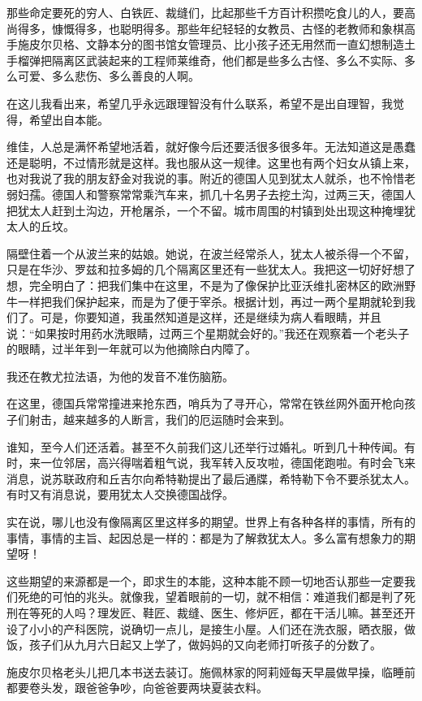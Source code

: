 那些命定要死的穷人、白铁匠、裁缝们，比起那些千方百计积攒吃食儿的人，要高尚得多，慷慨得多，也聪明得多。那些年纪轻轻的女教员、古怪的老教师和象棋高手施皮尔贝格、文静本分的图书馆女管理员、比小孩子还无用然而一直幻想制造土手榴弹把隔离区武装起来的工程师莱维奇，他们都是些多么古怪、多么不实际、多么可爱、多么悲伤、多么善良的人啊。

在这儿我看出来，希望几乎永远跟理智没有什么联系，希望不是出自理智，我觉得，希望出自本能。

维佳，人总是满怀希望地活着，就好像今后还要活很多很多年。无法知道这是愚蠢还是聪明，不过情形就是这样。我也服从这一规律。这里也有两个妇女从镇上来，也对我说了我的朋友舒金对我说的事。附近的德国人见到犹太人就杀，也不怜惜老弱妇孺。德国人和警察常常乘汽车来，抓几十名男子去挖土沟，过两三天，德国人把犹太人赶到土沟边，开枪屠杀，一个不留。城市周围的村镇到处出现这种掩埋犹太人的丘坟。

隔壁住着一个从波兰来的姑娘。她说，在波兰经常杀人，犹太人被杀得一个不留，只是在华沙、罗兹和拉多姆的几个隔离区里还有一些犹太人。我把这一切好好想了想，完全明白了：把我们集中在这里，不是为了像保护比亚沃维扎密林区的欧洲野牛一样把我们保护起来，而是为了便于宰杀。根据计划，再过一两个星期就轮到我们了。可是，你要知道，我虽然知道是这样，还是继续为病人看眼睛，并且说：“如果按时用药水洗眼睛，过两三个星期就会好的。”我还在观察着一个老头子的眼睛，过半年到一年就可以为他摘除白内障了。

我还在教尤拉法语，为他的发音不准伤脑筋。

在这里，德国兵常常撞进来抢东西，哨兵为了寻开心，常常在铁丝网外面开枪向孩子们射击，越来越多的人断言，我们的厄运随时会来到。

谁知，至今人们还活着。甚至不久前我们这儿还举行过婚礼。听到几十种传闻。有时，来一位邻居，高兴得喘着粗气说，我军转入反攻啦，德国佬跑啦。有时会飞来消息，说苏联政府和丘吉尔向希特勒提出了最后通牒，希特勒下令不要杀犹太人。有时又有消息说，要用犹太人交换德国战俘。

实在说，哪儿也没有像隔离区里这样多的期望。世界上有各种各样的事情，所有的事情，事情的主旨、起因总是一样的：都是为了解救犹太人。多么富有想象力的期望呀！

这些期望的来源都是一个，即求生的本能，这种本能不顾一切地否认那些一定要我们死绝的可怕的兆头。就像我，望着眼前的一切，就不相信：难道我们都是判了死刑在等死的人吗？理发匠、鞋匠、裁缝、医生、修炉匠，都在干活儿嘛。甚至还开设了小小的产科医院，说确切一点儿，是接生小屋。人们还在洗衣服，晒衣服，做饭，孩子们从九月六日起又上学了，做妈妈的又向老师打听孩子的分数了。

施皮尔贝格老头儿把几本书送去装订。施佩林家的阿莉娅每天早晨做早操，临睡前都要卷头发，跟爸爸争吵，向爸爸要两块夏装衣料。

